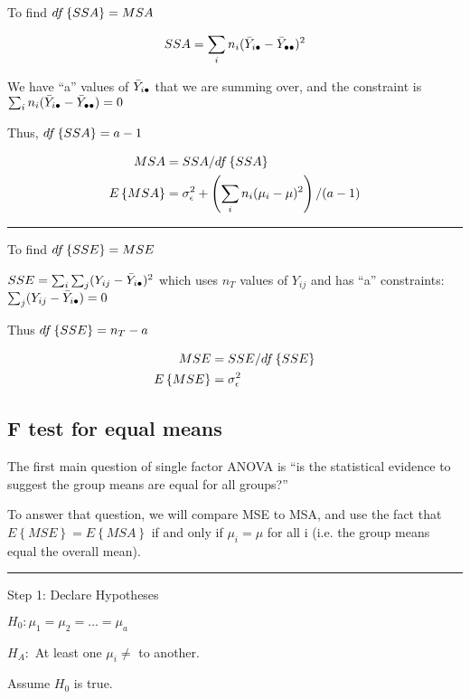 \documentclass[10pt]{article}
\newcommand{\emphas}[1]{\colorbox{DarkSeaGreen2}{#1}}
\newcommand{\mean}[1]{\mu_{#1}}
\renewcommand{\exp}[1]{E\left\{#1\right\}} %
\newcommand{\sigvar}[1]{\sigma^2_{#1}} %
\newcommand{\drawline}{\noindent\rule{\linewidth}{0.1pt}}
\begin{document}
\begin{multicols}{3}
    To find $df\left\{SSA\right\} = MSA$

    \begin{align*}
        SSA = \sum_i n_i (\bar Y_{i\bullet} - \bar Y_{\bullet\bullet})^2
    \end{align*}

    \newcommand{\bull}{\bullet\bullet}

    We have ``a'' values of $\bar Y_{i\bullet}$ that we are summing over, and the constraint is $\sum_i n_i (\bar Y_{i\bul} - \bar Y_{\bull}) = 0$

    Thus, $df\left\{SSA\right\} = a - 1$

    \begin{align*}
        MSA & = SSA/\df{SSA} \\
        \exp{MSA} & = \sigvar{\epsilon} + \left(\sum_i n_i (\mean{i} - \mu )^2\right)/(a-1)
    \end{align*}

    \drawline

    To find $df\left\{SSE\right\} = MSE$

    $SSE = \sum_i \sum_j (Y_{ij} - \bar Y_{i\bullet})^2$ which uses $n_T$ values of $Y_{ij}$ and has ``a'' constraints: $\sum_j (Y_{ij} - \bar Y_{i\bullet}) = 0$

    Thus $df\left\{SSE\right\} = n_T - a$

    \begin{align*}
        MSE & = SSE/\df{SSE} \\
        \exp{MSE} & = \sigvar{\epsilon}
    \end{align*}

    \subsection{F test for equal means}

    The first main question of single factor ANOVA is ``is the statistical evidence to suggest the group means are equal for all groups?''

    To answer that question, we will compare MSE to MSA, and use the fact that $\exp{MSE} = \exp{MSA}$ if and only if $\mean{i} = \mu$ for all i (i.e. the group means equal the overall mean).

    \drawline

    Step 1: Declare \emphas{Hypotheses}

    $H_0: \mean{1} = \mean{2} = \dots = \mean{a}$

    $H_A:$ At least one $\mean{i} \ne$ to another.

    Assume $H_0$ is true.


\end{multicols}
\end{document}
